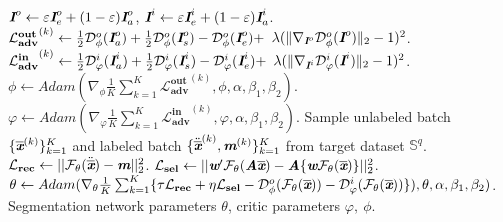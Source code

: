 \documentclass[letterpaper]{article} %
\begin{document}
\begin{algorithm}[!th]
\begin{algorithmic}[1]
\State $\textbf{\em I}^o \leftarrow  \varepsilon \textbf{\em I}^o_e+(1-\varepsilon)\textbf{\em I}^o_a$, $\textbf{\em I}^i \leftarrow  \varepsilon \textbf{\em I}^i_e+(1-\varepsilon)\textbf{\em I}^i_a$.
\State $\mathbf{\mathcal{L}^{out}_{adv}}^{(k)} \leftarrow \frac{1}{2}\mathcal{D}^o_{\phi}(\textbf{\em I}^o_a)  + \frac{1}{2}\mathcal{D}^{o}_{\phi}(\textbf{\em I}^o_s) - \mathcal{D}^{o}_{\phi}(\textbf{\em I}^o_e) +$ \Statex \quad \qquad \qquad \qquad \qquad $\lambda (\|\nabla_{\textbf{\em I}^o} \mathcal{D}^{o}_{\phi}(\textbf{\em I}^o)\|_{2}-1)^2$.
\State $\mathbf{\mathcal{L}^{in}_{adv}}^{(k)} \leftarrow \frac{1}{2}\mathcal{D}^i_{\varphi}(\textbf{\em I}^i_a)  + \frac{1}{2}\mathcal{D}^{i}_{\varphi}(\textbf{\em I}^i_s) - \mathcal{D}^{i}_{\varphi}(\textbf{\em I}^i_e) + $ \Statex \quad \qquad \qquad \qquad \qquad$\lambda (\|\nabla_{\textbf{\em I}^i} \mathcal{D}^{i}_{\varphi}(\textbf{\em I}^i)\|_{2}-1)^2$.
\EndFor
\State $\phi \leftarrow Adam(\nabla_{\phi}\frac{1}{K} \sum^K_{k=1}\mathbf{\mathcal{L}^{out}_{adv}}^{(k)},\phi,\alpha,\beta_1,\beta_2)$.
\State $\varphi \leftarrow Adam(\nabla_{\varphi}\frac{1}{K} \sum^K_{k=1}\mathbf{\mathcal{L}^{in}_{adv}}^{(k)},\varphi,\alpha,\beta_1,\beta_2)$.
\EndFor
\State Sample unlabeled batch $\{\overline{\textbf{\em x}}^{(k)}\}^K_{k=1}$ and labeled batch $\{\ddot{\overline{\textbf{\em x}}}^{(k)},\textbf{\em m}^{(k)}\}^K_{k=1}$ from target dataset $\mathbb{S}^q$.
\State $\mathbf{\mathcal{L}_{rec}}\leftarrow ||\mathcal{F}_{\theta}(\ddot{\overline{\textbf{\em x}}})-\textbf{\em m}||^2_2$.
\State  $\mathbf{\mathcal{L}_{sel}}\leftarrow ||\textbf{\em w}'\mathcal{F}_{\theta}(\textbf{\em A}\overline{\textbf{\em x}})-\textbf{\em A}\{\textbf{\em w}\mathcal{F}_{\theta}(\overline{\textbf{\em x}})\}||^2_2$.
\State $\theta \leftarrow Adam(\nabla_{\theta}\frac{1}{K} \sum^K_{k=1}\{\mathbf{\tau\mathcal{L}_{rec}}+ \eta\mathbf{\mathcal{L}_{sel}} -\mathcal{D}^{o}_{\phi}(\mathcal{F}_{\theta}(\overline{\textbf{\em x}}))-\mathcal{D}^{i}_{\varphi}(\mathcal{F}_{\theta}(\overline{\textbf{\em x}}))\}),\theta,\alpha,\beta_1,\beta_2)$.
\EndWhile
\State \Return Segmentation network parameters $\theta$, critic parameters $\varphi,~\phi$.
\end{algorithmic}
\label{alg:alg1}
\end{algorithm}
\end{document}
